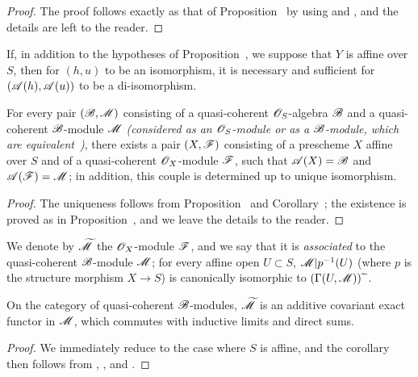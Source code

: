 \begin{proof}
The proof follows exactly as that of Proposition~ by using  and , and the details are left to the reader.
\end{proof}

\begin{corollary}[1.4.2]
\label{II.1.4.2}
If, in addition to the hypotheses of Proposition~, we suppose that $Y$ is affine over $S$, then for $(h,u)$ to be an isomorphism, it is necessary and sufficient for $(\mathscr{A}(h),\mathscr{A}(u))$ to be a di-isomorphism.
\end{corollary}

\begin{proposition}[1.4.3]
\label{II.1.4.3}
For every pair $(\mathscr{B},\mathscr{M})$ consisting of a quasi-coherent $\mathscr{O}_S$-algebra $\mathscr{B}$ and a quasi-coherent $\mathscr{B}$-module $\mathscr{M}$ \emph{(considered as an $\mathscr{O}_S$-module or as a $\mathscr{B}$-module, which are equivalent~)}, there exists a pair $(X,\mathscr{F})$ consisting of a prescheme $X$ affine over $S$ and of a quasi-coherent $\mathscr{O}_X$-module $\mathscr{F}$, such that $\mathscr{A}(X)=\mathscr{B}$ and $\mathscr{A}(\mathscr{F})=\mathscr{M}$; in addition, this couple is determined up to unique isomorphism.
\end{proposition}

\begin{proof}
The uniqueness follows from Proposition~ and Corollary~; the existence is proved as in Proposition~, and we leave the details to the reader.
\end{proof}

We denote by $\widetilde{\mathscr{M}}$ the $\mathscr{O}_X$-module $\mathscr{F}$, and we say that it is \emph{associated} to the quasi-coherent $\mathscr{B}$-module $\mathscr{M}$; for every affine open $U\subset S$, $\mathscr{M}|p^{-1}(U)$ (where $p$ is the structure morphism $X\to S$) is canonically isomorphic to $(\Gamma(U,\mathscr{M})){\,\widetilde{\,}\,}$.

\begin{corollary}[1.4.4]
\label{II.1.4.4}
On the category of quasi-coherent $\mathscr{B}$-modules, $\widetilde{\mathscr{M}}$ is an additive covariant exact functor in $\mathscr{M}$, which commutes with inductive limits and direct sums.
\end{corollary}

\begin{proof}
We immediately reduce to the case where $S$ is affine, and the corollary then follows from , , and .
\end{proof}

